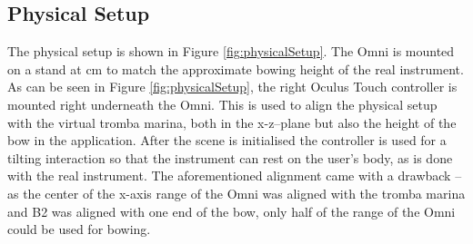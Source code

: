 
\subsection{Physical Setup}\label{subsec:physicalSetup}
The physical setup is shown in Figure \ref{fig:physicalSetup}. The Omni is mounted on a stand at  cm to match the approximate bowing height of the real instrument. As can be seen in Figure \ref{fig:physicalSetup}, the right Oculus Touch controller is mounted right underneath the Omni. This is used to align the physical setup with the virtual tromba marina, both in the x-z--plane but also the height of the bow in the application. After the scene is initialised the controller is used for a tilting interaction so that the instrument can rest on the user's body, as is done with the real instrument. The aforementioned alignment came with a drawback -- as the center of the x-axis range of the Omni was aligned with the tromba marina and B2 was aligned with one end of the bow, only half of the range of the Omni could be used for bowing.

